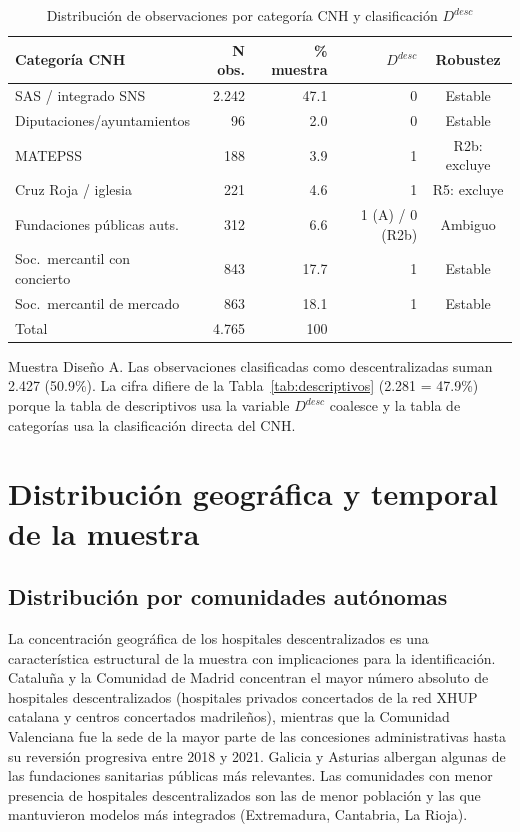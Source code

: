 \begin{table}[htbp]
\centering
\caption{Distribución de observaciones por categoría CNH y clasificación $D^{desc}$}
\label{tab:distribucion_categorias_cnh}
\begin{threeparttable}
\small
\begin{tabular}{lrrrc}
\toprule
\textbf{Categoría CNH} & \textbf{N obs.} & \textbf{\% muestra} & \textbf{$D^{desc}$} & \textbf{Robustez} \\
\midrule
SAS / integrado SNS         & 2.242 & 47.1 & 0 & Estable \\
Diputaciones/ayuntamientos  & 96    & 2.0  & 0 & Estable \\
MATEPSS                     & 188   & 3.9  & 1 & R2b: excluye \\
Cruz Roja / iglesia         & 221   & 4.6  & 1 & R5: excluye \\
Fundaciones públicas auts.  & 312   & 6.6  & 1 (A) / 0 (R2b) & Ambiguo \\
Soc.\ mercantil con concierto & 843  & 17.7 & 1 & Estable \\
Soc.\ mercantil de mercado  & 863   & 18.1 & 1 & Estable \\
\midrule
Total                       & 4.765 & 100  & & \\
\bottomrule
\end{tabular}
\begin{tablenotes}
  \small
  \item Muestra Diseño A. Las observaciones clasificadas como descentralizadas suman 2.427 (50.9\%). La cifra difiere de la Tabla~\ref{tab:descriptivos} (2.281 = 47.9\%) porque la tabla de descriptivos usa la variable $D^{desc}$ coalesce y la tabla de categorías usa la clasificación directa del CNH.
\end{tablenotes}
\end{threeparttable}
\end{table}

\section{Distribución geográfica y temporal de la muestra}
\label{sec:distribucion_muestra}

\subsection{Distribución por comunidades autónomas}

La concentración geográfica de los hospitales descentralizados es una característica estructural de la muestra con implicaciones para la identificación. Cataluña y la Comunidad de Madrid concentran el mayor número absoluto de hospitales descentralizados (hospitales privados concertados de la red XHUP catalana y centros concertados madrileños), mientras que la Comunidad Valenciana fue la sede de la mayor parte de las concesiones administrativas hasta su reversión progresiva entre 2018 y 2021. Galicia y Asturias albergan algunas de las fundaciones sanitarias públicas más relevantes. Las comunidades con menor presencia de hospitales descentralizados son las de menor población y las que mantuvieron modelos más integrados (Extremadura, Cantabria, La Rioja).

